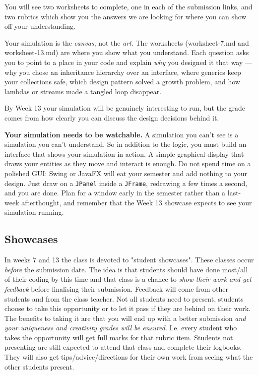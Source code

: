 \documentclass[twoside=false,DIV=14]{scrartcl}
\begin{document}
You will see two worksheets to complete, one in each of the submission links, and two rubrics which show you the answers we are looking for where you can show off your understanding.

Your simulation is the \emph{canvas}, not the \emph{art}. The worksheets (worksheet-7.md and worksheet-13.md) are where you show what you understand. Each question asks you to point to a place in your code and explain \emph{why} you designed it that way --- why you chose an inheritance hierarchy over an interface, where generics keep your collections safe, which design pattern solved a growth problem, and how lambdas or streams made a tangled loop disappear.

By Week 13 your simulation will be genuinely interesting to run, but the grade comes from how clearly you can discuss the design decisions behind it.

\textbf{Your simulation needs to be watchable.}  A simulation you can't see is a simulation you can't understand.  So in addition to the logic, you must build an interface that shows your simulation in action.  A simple graphical display that draws your entities as they move and interact is enough.  Do not spend time on a polished GUI: Swing or JavaFX will eat your semester and add nothing to your design.  Just draw on a \texttt{JPanel} inside a \texttt{JFrame}, redrawing a few times a second, and you are done.  Plan for a window early in the semester rather than a last-week afterthought, and remember that the Week 13 showcase expects to see your simulation running.

\subsection*{Showcases}
In weeks 7 and 13 the class is devoted to "student showcases".  These classes occur \emph{before} the submission date.  The idea is that students should have done most/all of their coding by this time and that class is a chance to \emph{show their work and get feedback} before finalising their submission.  Feedback will come from other students and from the class teacher.  Not all students need to present, students choose to take this opportunity or to let it pass if they are behind on their work.  The benefits to taking it are that you will end up with a better submission \emph{and your uniqueness and creativity grades will be ensured}.  I.e. every student who takes the opportunity will get full marks for that rubric item.  Students not presenting are still expected to attend that class and complete their logbooks.  They will also get tips/advice/directions for their own work from seeing what the other students present.
\end{document}
